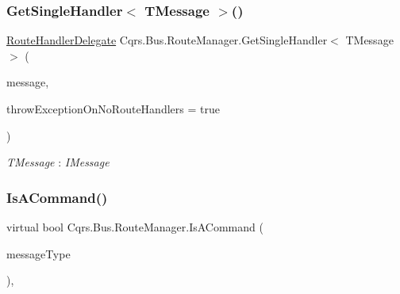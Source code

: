 \subsubsection{\texorpdfstring{Get\+Single\+Handler$<$ T\+Message $>$()}{GetSingleHandler< TMessage >()}\hspace{0.1cm}{\footnotesize\ttfamily [2/2]}}
{\footnotesize\ttfamily \hyperlink{classCqrs_1_1Bus_1_1RouteHandlerDelegate}{Route\+Handler\+Delegate} Cqrs.\+Bus.\+Route\+Manager.\+Get\+Single\+Handler$<$ T\+Message $>$ (\begin{DoxyParamCaption}\item[{T\+Message}]{message,  }\item[{bool}]{throw\+Exception\+On\+No\+Route\+Handlers = {\ttfamily true} }\end{DoxyParamCaption})}

\begin{Desc}
\item[Type Constraints]\begin{description}
\item[{\em T\+Message} : {\em I\+Message}]\end{description}
\end{Desc}
\mbox{\label{classCqrs_1_1Bus_1_1RouteManager_a7b7bfc4db30cc5956c4acd6a342e9159_a7b7bfc4db30cc5956c4acd6a342e9159}} 
\subsubsection{\texorpdfstring{Is\+A\+Command()}{IsACommand()}}
{\footnotesize\ttfamily virtual bool Cqrs.\+Bus.\+Route\+Manager.\+Is\+A\+Command (\begin{DoxyParamCaption}\item[{Type}]{message\+Type }\end{DoxyParamCaption})\hspace{0.3cm}{\ttfamily [protected]}, {\ttfamily [virtual]}}

\mbox{\label{classCqrs_1_1Bus_1_1RouteManager_a1ee8d583bb5d75a54cdac03c8e84b8d9_a1ee8d583bb5d75a54cdac03c8e84b8d9}} 
